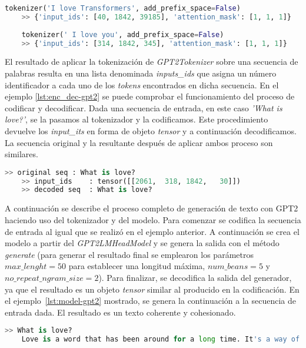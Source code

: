 \begin{lstlisting}[language=Python, caption=Ejemplo de uso de \textit{GPT2Tokenizer}, label={lst:tokenizer-gpt2}]
	tokenizer('I love Transformers', add_prefix_space=False)
	>> {'input_ids': [40, 1842, 39185], 'attention_mask': [1, 1, 1]}
	
	tokenizer(' I love you', add_prefix_space=False)
	>> {'input_ids': [314, 1842, 345], 'attention_mask': [1, 1, 1]}
\end{lstlisting} 

El resultado de aplicar la tokenización de \textit{GPT2Tokenizer} sobre una secuencia de palabras resulta en una lista denominada \textit{inputs\_ids} que asigna un número identificador a cada uno de los \textit{tokens} encontrados en dicha secuencia. En el ejemplo \ref{lst:enc_dec-gpt2} se puede comprobar el funcionamiento del proceso de codificar y decodificar. Dada una secuencia de entrada, en este caso \textit{'What is love?'}, se la pasamos al tokenizador y la codificamos. Este procedimiento devuelve los \textit{input\_its} en forma de objeto \textit{tensor} y a continuación decodificamos. La secuencia original y la resultante después de aplicar ambos proceso son similares.

\begin{lstlisting}[language=Python, caption= Encode y Decode, label={lst:enc_dec-gpt2}]
	>> original seq : What is love?
	>> input_ids    : tensor([[2061,  318, 1842,   30]])
	>> decoded seq  : What is love?
\end{lstlisting} 

A continuación se describe el proceso completo de generación de texto con GPT2 haciendo uso del tokenizador y del modelo. Para comenzar se codifica la secuencia de entrada al igual que se realizó en el ejemplo anterior. A continuación se crea el modelo a partir del \textit{GPT2LMHeadModel} y se genera la salida con el método \textit{generate} (para generar el resultado final se emplearon los parámetros $max\_lenght=50$ para establecer una longitud máxima, $num\_beans=5$ y $no\_repeat\_ngram\_size=2$). Para finalizar, se decodifica la salida del generador, ya que el resultado es un objeto \textit{tensor} similar al producido en la codificación. En el ejemplo~\ref{lst:model-gpt2} mostrado, se genera la continuación a la secuencia de entrada dada. El resultado es un texto coherente y cohesionado.

\begin{lstlisting}[language=Python, caption=Ejemplo de uso de \textit{GPT2LMHeadModel}, label={lst:model-gpt2}]
	>> What is love?
	Love is a word that has been around for a long time. It's a way of saying "I love you, but I don't know what it means to love someone else."	
\end{lstlisting} 

